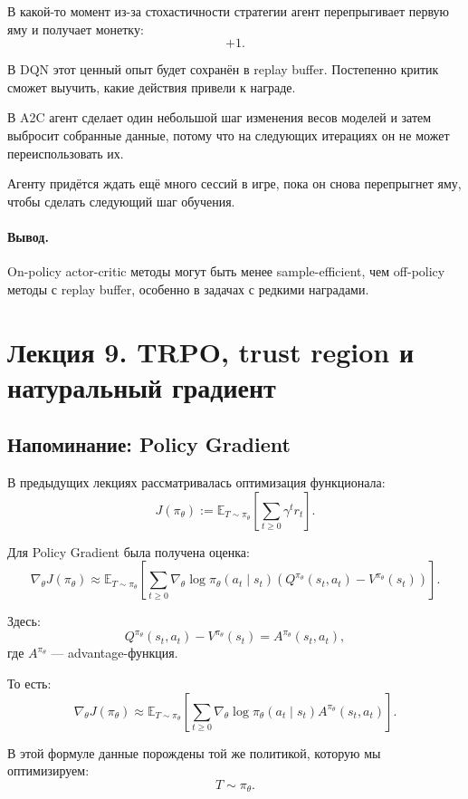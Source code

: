 \documentclass[12pt,a4paper]{article}
\begin{document}
В какой-то момент из-за стохастичности стратегии агент перепрыгивает первую яму и получает монетку:
\[
+1.
\]

В DQN этот ценный опыт будет сохранён в replay buffer. Постепенно критик сможет выучить, какие действия привели к награде.

В A2C агент сделает один небольшой шаг изменения весов моделей и затем выбросит собранные данные, потому что на следующих итерациях он не может переиспользовать их.

Агенту придётся ждать ещё много сессий в игре, пока он снова перепрыгнет яму, чтобы сделать следующий шаг обучения.

\paragraph{Вывод.}

On-policy actor-critic методы могут быть менее sample-efficient, чем off-policy методы с replay buffer, особенно в задачах с редкими наградами.



\section{Лекция 9. TRPO, trust region и натуральный градиент}

\subsection{Напоминание: Policy Gradient}

В предыдущих лекциях рассматривалась оптимизация функционала:
\[
J(\pi_\theta)
:=
\mathbb E_{T\sim\pi_\theta}
\left[
\sum_{t\ge 0}
\gamma^t r_t
\right].
\]

Для Policy Gradient была получена оценка:
\[
\nabla_\theta J(\pi_\theta)
\approx
\mathbb E_{T\sim\pi_\theta}
\left[
\sum_{t\ge 0}
\nabla_\theta
\log \pi_\theta(a_t\mid s_t)
\left(
Q^{\pi_\theta}(s_t,a_t)
-
V^{\pi_\theta}(s_t)
\right)
\right].
\]

Здесь:
\[
Q^{\pi_\theta}(s_t,a_t)
-
V^{\pi_\theta}(s_t)
=
A^{\pi_\theta}(s_t,a_t),
\]
где $A^{\pi_\theta}$ --- advantage-функция.

То есть:
\[
\nabla_\theta J(\pi_\theta)
\approx
\mathbb E_{T\sim\pi_\theta}
\left[
\sum_{t\ge 0}
\nabla_\theta
\log \pi_\theta(a_t\mid s_t)
A^{\pi_\theta}(s_t,a_t)
\right].
\]

В этой формуле данные порождены той же политикой, которую мы оптимизируем:
\[
T\sim\pi_\theta.
\]
\end{document}
